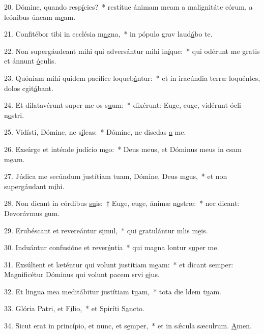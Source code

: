 20. Dómine, quando resp\uline{í}cies?~* restítue ánimam meam a malignitáte eórum, a leónibus úncam m\uline{e}am.\par 
21. Confitébor tibi in ecclésia m\uline{a}gna,~* in pópulo grav laud\uline{á}bo te.\par 
22. Non supergáudeant mihi qui adversántur mihi in\uline{í}que:~* qui odérunt me gratis et ánnunt \uline{ó}culis.\par 
23. Quóniam mihi quidem pacífice loqueb\uline{á}ntur:~* et in iracúndia terræ loquéntes, dolos cgit\uline{á}bant.\par 
24. Et dilatavérunt super me os s\uline{u}um:~* dixérunt: Euge, euge, vidérunt ócli n\uline{o}stri.\par 
25. Vidísti, Dómine, ne s\uline{í}leas:~* Dómine, ne discdas \uline{a} me.\par 
26. Exsúrge et inténde judício m\uline{e}o:~* Deus meus, et Dóminus meus in csam m\uline{e}am.\par 
27. Júdica me secúndum justítiam tuam, Dómine, Deus m\uline{e}us,~* et non supergáudant m\uline{i}hi.\par 
28. Non dicant in córdibus \uline{su}is:~† Euge, euge, ánimæ n\uline{o}stræ:~* nec dicant: Devorávmus \uline{e}um.\par 
29. Erubéscant et revereántur s\uline{i}mul,~* qui gratulántur mlis m\uline{e}is.\par 
30. Induántur confusióne et rever\uline{é}ntia~* qui magna lontur s\uline{u}per me.\par 
31. Exsúltent et læténtur qui volunt justítiam m\uline{e}am:~* et dicant semper: Magnificétur Dóminus qui volunt pacem srvi \uline{e}jus.\par 
32. Et lingua mea meditábitur justítiam t\uline{u}am,~* tota die ldem t\uline{u}am.\par 
33. Glória Patri, et F\uline{í}lio,~* et Spiríti S\uline{a}ncto.\par 
34. Sicut erat in princípio, et nunc, et s\uline{e}mper,~* et in sǽcula sæculrum. \uline{A}men.\par 
